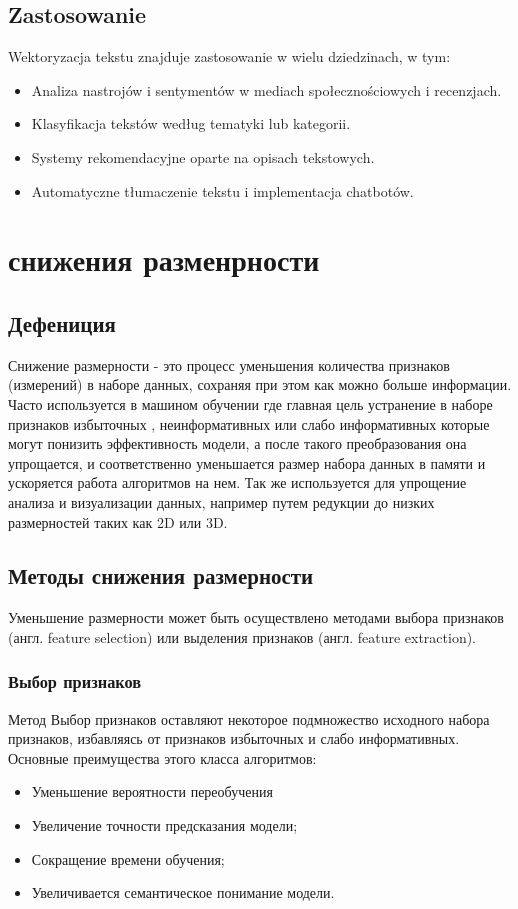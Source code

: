 	\subsection{Zastosowanie}
		Wektoryzacja tekstu znajduje zastosowanie w wielu dziedzinach, w tym:
		\begin{itemize}
			\item Analiza nastrojów i sentymentów w mediach społecznościowych i recenzjach.
			\item Klasyfikacja tekstów według tematyki lub kategorii.
			\item Systemy rekomendacyjne oparte na opisach tekstowych.
			\item Automatyczne tłumaczenie tekstu i implementacja chatbotów.
		\end{itemize}


\section{снижения разменрности}

	\subsection{Дефениция}
		Снижение размерности - это процесс уменьшения количества признаков (измерений) в наборе данных, сохраняя при этом как можно больше информации. Часто используется в машином обучении где главная цель устранение в наборе  признаков избыточных , неинформативных или слабо информативных которые могут  понизить эффективность модели, а после такого преобразования она упрощается, и соответственно уменьшается размер набора данных в памяти и ускоряется работа алгоритмов на нем. Так же используется для упрощение анализа и визуализации данных, например путем редукции до низких размерностей таких как 2D или 3D. \cite{DimensionReduction}

	\subsection{Методы снижения размерности}
		Уменьшение размерности может быть осуществлено методами выбора признаков (англ. feature selection) или выделения признаков (англ. feature extraction).
		
		\subsubsection{Выбор признаков}
			Метод Выбор признаков оставляют некоторое подмножество исходного набора признаков, избавляясь от признаков избыточных и слабо информативных. Основные преимущества этого класса алгоритмов:
			\begin{itemize}
				\item Уменьшение вероятности переобучения
				\item Увеличение точности предсказания модели;
				\item Сокращение времени обучения;
				\item Увеличивается семантическое понимание модели.\\
			\end{itemize}
		
